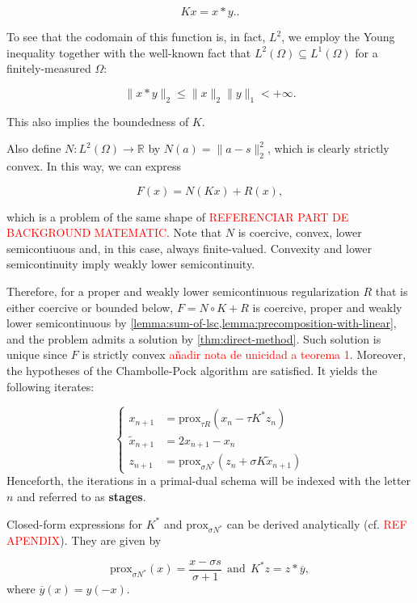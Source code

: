 \documentclass[twocolumn,twoside,a4paper,10pt]{IEEEtran}
\newcommand{\Frank}[1]{\textcolor{red}{#1}}
\begin{document}
\[
  Kx=x\ast y.
.\]

To see that the codomain of this function is, in fact, \(L^2\), we employ the Young inequality together with the well-known fact that \(L^2(\Omega)\subseteq L^1(\Omega)\) for a finitely-measured \(\Omega\):

\[
  \|x\ast y\|_2 \leq \|x\|_{2}\|y\|_{1} < +\infty
.\]

This also implies the boundedness of \(K\).

Also define \(N\colon L^2(\Omega)\to \mathbb{R}\) by \(N(a) = \|a - s\|_{2}^2\), which is clearly strictly convex. In this way, we can express

\[
  F(x) = N(Kx) + R(x),
\]

which is a problem of the same shape of \Frank{REFERENCIAR PART DE BACKGROUND MATEMATIC}. Note that \(N\) is coercive, convex, lower semicontiuous and, in this case, always finite-valued. Convexity and lower semicontinuity imply weakly lower semicontinuity.

Therefore, for a proper and weakly lower semicontinuous regularization \(R\) that is either coercive or bounded below, 
\(F=N\circ K + R\) is coercive, proper and weakly lower semicontinuous by \cref{lemma:sum-of-lsc,lemma:precomposition-with-linear}, and the problem admits a solution by \cref{thm:direct-method}. Such solution is unique since \(F\) is strictly convex \Frank{añadir nota de unicidad a teorema 1}. Moreover, the hypotheses of the Chambolle-Pock algorithm are satisfied. It yields the following iterates:

\begin{equation}\label{eq:iterates}
  \left\{
  \begin{split}
    x_{n+1} & = \text{prox}_{\tau R}(x_n - \tau K^*z_n) \\
    \tilde{x}_{n+1} & = 2x_{n+1} - x_n \\
    z_{n+1} & = \text{prox}_{\sigma N^*}(z_n + \sigma K\tilde{x}_{n+1})
  \end{split}
  \right.
\end{equation}
Henceforth, the iterations in a primal-dual schema will be indexed with the letter \(n\) and referred to as \textbf{stages}.

Closed-form expressions for \(K^*\) and \(\text{prox}_{\sigma N^*}\) can be derived analytically (cf. \Frank{REF APENDIX}). They are given by

\begin{equation}\label{eq:primal-dual-analytical}
  \text{prox}_{\sigma N^*}(x) = \frac{x-\sigma s}{\sigma + 1} ~~ \text{and} ~~ K^*z = z\ast \overline{y},
\end{equation}
where \(\overline{y}(x) = y(-x)\).
\end{document}
